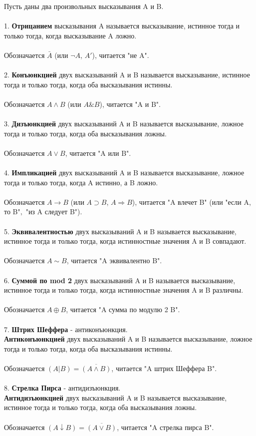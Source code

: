 \documentclass{article}
\begin{document}
	Пусть даны два произвольных высказывания A и B.
	\\\\
	1. \textbf{Отрицанием} высказывания A называется высказывание,
	истинное тогда и только тогда, когда высказывание A ложно.
	\\\\
	Обозначается $\bar{A}$ (или $\neg A$, $A'$), читается "не A".	
	\\\\
	2. \textbf{Конъюнкцией} двух высказываний A и B называется
	высказывание, истинное тогда и только тогда, когда оба
	высказывания истинны.
	\\\\
	Обозначается $A \wedge B$ (или $A \& B$), читается "A и B".
	\\\\
	3. \textbf{Дизъюнкцией} двух высказываний A и B называется
	высказывание, ложное тогда и только тогда, когда оба
	высказывания ложны.
	\\\\
	Обозначается $A \vee B$, читается "A или B".
	\\\\
	4. \textbf{Импликацией} двух высказываний A и B называется
	высказывание, ложное тогда и только тогда, когда A истинно,
	а B ложно.
	\\\\
	Обозначается $A \rightarrow B$  (или $A \supset B$, $A \Rightarrow B$),
	читается "A влечет B" (или "если A, то B"$,$ "из A следует B").
	\\\\
	5. \textbf{Эквивалентностью} двух высказываний A и B называется
	высказывание, истинное тогда и только тогда, когда истинностные
	значения A и B совпадают.
	\\\\
	Обозначается $A \sim B$, читается "A эквивалентно B".
	\\\\
	6. \textbf{Суммой по mod 2} двух высказываний A и B называется высказывание,
	истинное тогда и только тогда, когда истинностные значения A и B различны.
	\\\\
	Обозначается $A \oplus B$, читается "A сумма по модулю 2 B".
	\\\\
	7. \textbf{Штрих Шеффера} - антиконъюнкция.\\
	\textbf{Антиконъюнкцией} двух высказываний A и B называется высказывание,
	ложное тогда и только тогда, когда оба высказывания истинны.
	\\\\
	Обозначается $(A | B) = \overline{(A \wedge B)}$, читается "A штрих Шеффера B".
	\\\\
	8. \textbf{Стрелка Пирса} - антидизъюнкция.\\
	\textbf{Антидизъюнкцией} двух высказываний A и B называется высказывание,
	истинное тогда и только тогда, когда оба высказывания ложны.
	\\\\
	Обозначается $(A \downarrow B) = \overline{(A \vee B)}$, читается "A стрелка пирса B".
	
\end{document}
